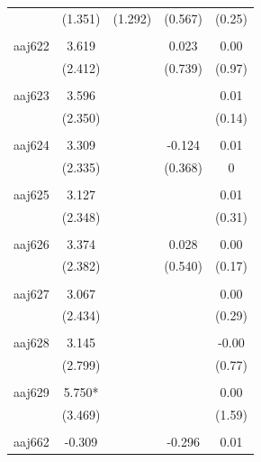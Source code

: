 \documentclass[12pt, a4paper]{article}
\begin{document}
{\begin{longtable}{@{\extracolsep{5pt}}lcccc}
				& (1.351)    & (1.292)    & (0.567)   & (0.25)  \\
				&            &            &           &         \\
				aaj622     & 3.619      &            & 0.023     & 0.00    \\
				& (2.412)    &            & (0.739)   & (0.97)  \\
				&            &            &           &         \\
				aaj623     & 3.596      &            &           & 0.01    \\
				& (2.350)    &            &           & (0.14)  \\
				&            &            &           &         \\
				aaj624     & 3.309      &            & -0.124    & 0.01    \\
				& (2.335)    &            & (0.368)   & 0       \\
				&            &            &           &         \\
				aaj625     & 3.127      &            &           & 0.01    \\
				& (2.348)    &            &           & (0.31)  \\
				&            &            &           &         \\
				aaj626     & 3.374      &            & 0.028     & 0.00    \\
				& (2.382)    &            & (0.540)   & (0.17)  \\
				&            &            &           &         \\
				aaj627     & 3.067      &            &           & 0.00    \\
				& (2.434)    &            &           & (0.29)  \\
				&            &            &           &         \\
				aaj628     & 3.145      &            &           & -0.00   \\
				& (2.799)    &            &           & (0.77)  \\
				&            &            &           &         \\
				aaj629     & 5.750*     &            &           & 0.00    \\
				& (3.469)    &            &           & (1.59)  \\
				&            &            &           &         \\
				aaj662     & -0.309     &            & -0.296    & 0.01    \\

\end{longtable}}
\end{document}
